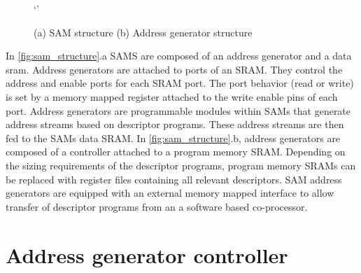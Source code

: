 \begin{figure}
    \centering`'
    \caption{(a) SAM structure (b) Address generator structure}
    \label{fig:sam_structure}
\end{figure}

In \autoref{fig:sam_structure}.a SAMS are composed of an address generator and a
data sram. Address generators are attached to ports of an SRAM. They control the
address and enable ports for each SRAM port. The port behavior (read or write)
is set by a memory mapped register attached to the write enable pins of each
port. Address generators are programmable modules within SAMs that generate address
streams based on descriptor programs. These address streams are then fed to the
SAMs data SRAM. In \autoref{fig:sam_structure}.b, address generators are
composed of a controller attached to a program memory SRAM. Depending on the
sizing requirements of the descriptor programs, program memory SRAMs can be
replaced with register files containing all relevant descriptors. SAM address
generators are equipped with an external memory mapped interface to allow
transfer of descriptor programs from an a software based co-processor.

\section{Address generator controller}
\label{chap:data_orchestration:sams:controller}

